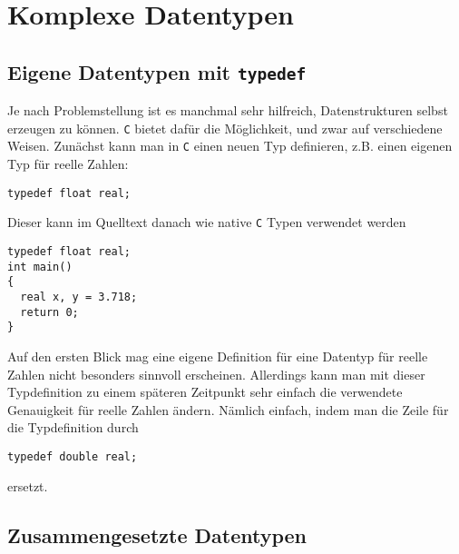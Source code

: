 \section{Komplexe Datentypen}

\subsection{Eigene Datentypen mit \texttt{typedef}}

Je nach Problemstellung ist es manchmal sehr hilfreich, Datenstrukturen selbst erzeugen zu können.
\texttt{C} bietet dafür die Möglichkeit, und zwar auf verschiedene Weisen.
Zunächst kann man in \texttt{C} einen neuen Typ definieren, z.B. einen eigenen Typ für reelle Zahlen:
\begin{lstlisting}
typedef float real;
\end{lstlisting}
Dieser kann im Quelltext danach wie native \texttt{C} Typen verwendet werden
\begin{lstlisting}
typedef float real;
int main()
{
  real x, y = 3.718;
  return 0;
}
\end{lstlisting}
Auf den ersten Blick mag eine eigene Definition für eine Datentyp für reelle Zahlen nicht besonders sinnvoll erscheinen.
Allerdings kann man mit dieser Typdefinition zu einem späteren Zeitpunkt sehr einfach die verwendete Genauigkeit für reelle Zahlen ändern.
Nämlich einfach, indem man die Zeile für die Typdefinition durch
\begin{lstlisting}
typedef double real;
\end{lstlisting}
ersetzt.

\subsection{Zusammengesetzte Datentypen}

